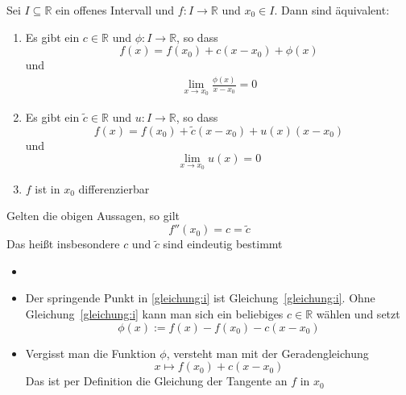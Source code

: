 \begin{Satz}{
	Sei $I \subseteq \mathbb{R}$ ein offenes Intervall und $f: I \rightarrow \mathbb{R}$ und $x_0 \in I$. Dann sind äquivalent:
	\begin{enumerate}
		\item \label{satz1:i}Es gibt ein $c \in \mathbb{R}$ und $\phi: I \rightarrow \mathbb{R}$, so dass
		\begin{equation*}
		f\left(x\right) = f\left(x_0\right) + c\left(x-x_0\right) + \phi\left(x\right)
		\end{equation*} 
		und 
		\begin{align} 
			\lim\limits_{x \rightarrow x_0}{\frac{\phi\left(x\right)}{x-x_0}}  = 0
			\label{gleichung:i}
		\end{align}
		\item Es gibt ein $ \tilde{c} \in \mathbb{R}$ und $
		u: I \rightarrow \mathbb{R}$, so dass 
	\begin{equation*}		
		f\left(x\right) = f\left(x_0\right) + \tilde{c}\left(x-x_0\right) + u\left(x
		\right)\left(x-x_0\right)
		\end{equation*}
		und 
		\begin{equation*}
		\lim\limits_{x \rightarrow x_0}{u\left(x\right) = 0}
		\end{equation*}
		\item $f$ ist in $x_0$ differenzierbar
	\end{enumerate}
	Gelten die obigen Aussagen, so gilt 
	\begin{equation*}
		f''\left(x_0\right) = c = \tilde{c}
	\end{equation*}
	Das heißt insbesondere $c$ und $\tilde{c}$ sind eindeutig bestimmt

}\end{Satz}

\begin{Bemerkung}{
	\begin{itemize}
		\item[ ]
		\item Der springende Punkt in \ref{gleichung:i} ist 
		Gleichung~\ref{gleichung:i}. Ohne Gleichung~\ref{gleichung:i} 
		kann man sich ein beliebiges $c \in \mathbb{R}$ wählen und setzt 
	\begin{equation*}
	\phi\left(x\right) := f\left(x\right) - f\left(x_0\right) - c\left(x-x_0\right)
	\end{equation*}			
	\item Vergisst man die Funktion $\phi$, versteht man mit der Geradengleichung 
		\begin{equation*}
		x \mapsto f\left(x_0\right) + c\left(x-x_0\right)
		\end{equation*}
		Das ist per Definition die Gleichung der Tangente an $f$ in $x_0$
	\end{itemize}
}\end{Bemerkung}

